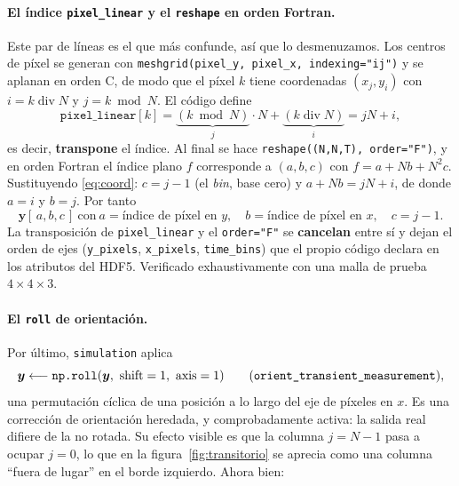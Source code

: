 \documentclass[11pt,a4paper]{article}
\newcommand{\vect}[1]{\boldsymbol{#1}}
\newcommand{\code}[1]{\texttt{#1}}
\theoremstyle{definition}
\theoremstyle{plain}
\begin{document}
\paragraph{El índice \code{pixel\_linear} y el \code{reshape} en orden Fortran.}
Este par de líneas es el que más confunde, así que lo desmenuzamos. Los centros
de píxel se generan con \code{meshgrid(pixel\_y, pixel\_x, indexing="ij")} y se
aplanan en orden C, de modo que el píxel $k$ tiene coordenadas
$(x_{j},y_{i})$ con $i=k\;\mathrm{div}\;N$ y $j=k\bmod N$. El código define
%
\begin{equation}
\texttt{pixel\_linear}[k] = \underbrace{(k\bmod N)}_{j}\cdot N +
                            \underbrace{(k\;\mathrm{div}\;N)}_{i}
                          = jN+i ,
\end{equation}
%
es decir, \textbf{transpone} el índice. Al final se hace
\code{reshape((N,N,T), order="F")}, y en orden Fortran el índice plano $f$
corresponde a $(a,b,c)$ con $f=a+Nb+N^2c$. Sustituyendo \eqref{eq:coord}:
$c=j-1$ (el \emph{bin}, base cero) y $a+Nb=jN+i$, de donde $a=i$ y $b=j$. Por
tanto
%
\begin{equation}
\label{eq:ejes}
\boxed{\ \vect y[\,a,b,c\,] \ \text{con}\
a = \text{índice de píxel en } y,\quad
b = \text{índice de píxel en } x,\quad
c = j-1 .\ }
\end{equation}
%
La transposición de \code{pixel\_linear} y el \code{order="F"} se
\textbf{cancelan} entre sí y dejan el orden de ejes
(\code{y\_pixels}, \code{x\_pixels}, \code{time\_bins}) que el propio código
declara en los atributos del HDF5. Verificado exhaustivamente con una malla de
prueba $4\times4\times3$.

\paragraph{El \code{roll} de orientación.}
Por último, \code{simulation} aplica
%
\begin{equation}
\label{eq:roll}
\vect y \longleftarrow \texttt{np.roll}(\vect y,\ \text{shift}=1,\ \text{axis}=1)
\qquad\text{(\code{orient\_transient\_measurement})} ,
\end{equation}
%
una permutación cíclica de una posición a lo largo del eje de píxeles en $x$.
Es una corrección de orientación heredada, y comprobadamente activa: la salida
real difiere de la no rotada. Su efecto visible es que la columna $j=N-1$ pasa a
ocupar $j=0$, lo que en la figura~\ref{fig:transitorio} se aprecia como una
columna \enquote{fuera de lugar} en el borde izquierdo. Ahora bien:
\end{document}
